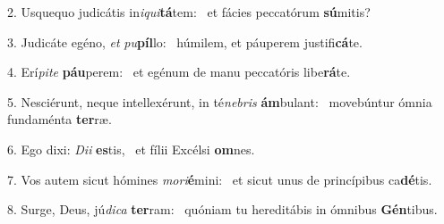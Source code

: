 2. Usquequo judicátis in\textit{i}\textit{qui}\textbf{tá}tem: \ast\  et fácies peccatórum \textbf{sú}mitis?\

3. Judicáte egéno, \textit{et} \textit{pu}\textbf{píl}lo: \ast\  húmilem, et páuperem justifi\textbf{cá}te.\

4. Erí\textit{pi}\textit{te} \textbf{páu}perem: \ast\  et egénum de manu peccatóris libe\textbf{rá}te.\

5. Nesciérunt, neque intellexérunt, in té\textit{ne}\textit{bris} \textbf{ám}bulant: \ast\  movebúntur ómnia fundaménta \textbf{ter}ræ.\

6. Ego dixi: \textit{Di}\textit{i} \textbf{es}tis, \ast\  et fílii Excélsi \textbf{om}nes.\

7. Vos autem sicut hómines \textit{mo}\textit{ri}\textbf{é}mini: \ast\  et sicut unus de princípibus ca\textbf{dé}tis.\

8. Surge, Deus, jú\textit{di}\textit{ca} \textbf{ter}ram: \ast\  quóniam tu hereditábis in ómnibus \textbf{Gén}tibus.\

